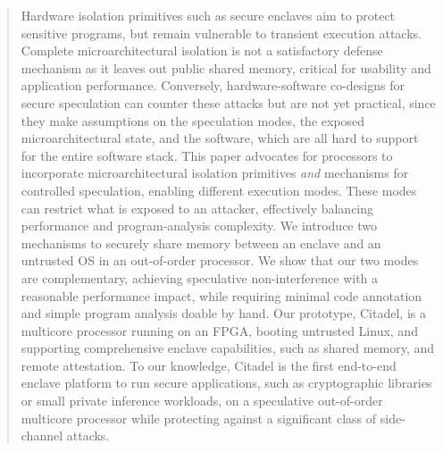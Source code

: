 \begin{abstract}

Hardware isolation primitives such as secure enclaves aim to protect sensitive programs, but remain vulnerable to transient execution attacks.
Complete microarchitectural isolation is not a satisfactory defense mechanism as it leaves out public shared memory, critical for usability and application performance.
Conversely, hardware-software co-designs for secure speculation can counter these attacks but are not yet practical, since they make assumptions on the speculation modes, the exposed microarchitectural state, and the software, which are all hard to support for the entire software stack.
This paper advocates for processors to incorporate microarchitectural isolation primitives \emph{and} mechanisms for controlled speculation, enabling different execution modes.
These modes can restrict what is exposed to an attacker, 
effectively balancing performance and program-analysis complexity.
We introduce two mechanisms to securely share memory between an enclave and an untrusted OS in an out-of-order processor.
We show that our two modes are complementary, achieving speculative non-interference with a reasonable performance impact, while requiring minimal code annotation and simple program analysis doable by hand.
Our prototype, Citadel, is a multicore processor running on an FPGA, booting untrusted Linux, and supporting comprehensive enclave capabilities, such as shared memory, and remote attestation.
To our knowledge, Citadel is the first end-to-end enclave platform to run secure applications, such as cryptographic libraries or small private inference workloads, on a speculative out-of-order multicore processor while protecting against a significant class of side-channel attacks.

\end{abstract}